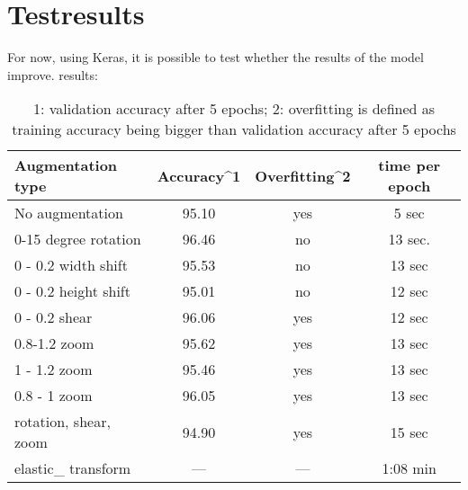 \documentclass{article}
\begin{document}
\section{Testresults}
For now, using Keras, it is possible to test whether the results of the model improve.
results:
\begin{table}[h]
    \centering
    \begin{tabular}{l|c|c|c}
    Augmentation type & Accuracy^1 & Overfitting^2 & time per epoch \\ \hline
    No augmentation & 95.10 & yes & 5 sec \\
    0-15 degree rotation & 96.46 & no & 13 sec.\\ 
    0 - 0.2 width shift & 95.53 & no & 13 sec\\ 
    0 - 0.2 height shift & 95.01 & no & 12 sec\\ 
    0 - 0.2 shear & 96.06 & yes & 12 sec\\
    0.8-1.2 zoom & 95.62 & yes & 13 sec\\
    1 - 1.2 zoom & 95.46 & yes & 13 sec\\
    0.8 - 1 zoom & 96.05 & yes & 13 sec\\
    rotation, shear, zoom & 94.90 & yes & 15 sec\\
    elastic\_ transform & ---& --- & 1:08 min\\
    \end{tabular}
    \caption{1: validation accuracy after 5 epochs; 2: overfitting is defined as training accuracy being bigger than validation accuracy after 5 epochs}
    \label{tab:my_label}
\end{table}




\end{document}
